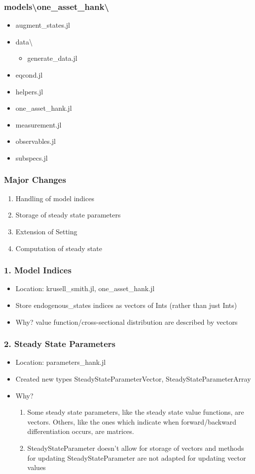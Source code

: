 \documentclass{beamer}
\begin{document}
\begin{frame}
\frametitle{models\textbackslash one\_asset\_hank\textbackslash}
    \begin{itemize}
      \item augment\_states.jl
      \item data\textbackslash
      \begin{itemize}
        \item generate\_data.jl
       \end{itemize}
      \item eqcond.jl
      \item helpers.jl
      \item one\_asset\_hank.jl
      \item measurement.jl
      \item observables.jl
      \item subspecs.jl
    \end{itemize}
\end{frame}

\begin{frame}
  \frametitle{Major Changes}
  \begin{enumerate}
  \item Handling of model indices
  \item Storage of steady state parameters
  \item Extension of Setting
  \item Computation of steady state
  \end{enumerate}
\end{frame}

\begin{frame}
  \frametitle{1. Model Indices}
  \begin{itemize}
  \item Location: krusell\_smith.jl, one\_asset\_hank.jl
  \item Store endogenous\_states indices as vectors of Ints (rather than just Ints)
  \item Why? value function/cross-sectional distribution are described by vectors
  \end{itemize}
\end{frame}

\begin{frame}
  \frametitle{2. Steady State Parameters}
  \begin{itemize}
  \item Location: parameters\_hank.jl
  \item Created new types SteadyStateParameterVector, SteadyStateParameterArray
  \item Why?
    \begin{enumerate}
    \item Some steady state parameters, like the steady state value functions, are vectors. Others, like the ones which indicate when forward/backward differentiation occurs, are matrices.
    \item SteadyStateParameter doesn't allow for storage of vectors and methods for updating SteadyStateParameter are not adapted for updating vector values
    \end{enumerate}
  \end{itemize}
\end{frame}
\end{document}
